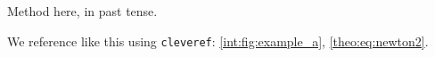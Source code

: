 Method here, in past tense.

We reference like this using \verb|cleveref|: \cref{int:fig:example_a}, \cref{theo:eq:newton2}.